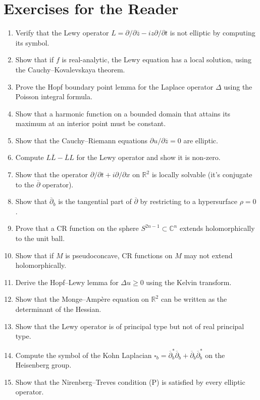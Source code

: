\section*{Exercises for the Reader}
\begin{enumerate}
    \item [B] Verify that the Lewy operator $L = \partial/\partial \overline{z} - i z \partial/\partial t$ is not elliptic by computing its symbol.
    \item [I] Show that if $f$ is real-analytic, the Lewy equation has a local solution, using the Cauchy--Kovalevskaya theorem.
    \item [I] Prove the Hopf boundary point lemma for the Laplace operator $\Delta$ using the Poisson integral formula.
    \item [B] Show that a harmonic function on a bounded domain that attains its maximum at an interior point must be constant.
    \item [B] Show that the Cauchy--Riemann equations $\partial u/\partial \overline{z} = 0$ are elliptic.
    \item [I] Compute $L\overline{L} - \overline{L}L$ for the Lewy operator and show it is non-zero.
    \item [I] Show that the operator $\partial/\partial t + i \partial/\partial x$ on $\mathbb{R}^2$ is locally solvable (it's conjugate to the $\overline{\partial}$ operator).
    \item [I] Show that $\overline{\partial}_b$ is the tangential part of $\overline{\partial}$ by restricting to a hypersurface $\rho = 0$.
    \item [I] Prove that a CR function on the sphere $S^{2n-1} \subset \mathbb{C}^n$ extends holomorphically to the unit ball.
    \item [A] Show that if $M$ is pseudoconcave, CR functions on $M$ may not extend holomorphically.
    \item [I] Derive the Hopf--Lewy lemma for $\Delta u \geq 0$ using the Kelvin transform.
    \item [B] Show that the Monge--Amp\`{e}re equation on $\mathbb{R}^2$ can be written as the determinant of the Hessian.
    \item [A] Show that the Lewy operator is of principal type but not of real principal type.
    \item [A] Compute the symbol of the Kohn Laplacian $\square_b = \overline{\partial}_b^* \overline{\partial}_b + \overline{\partial}_b \overline{\partial}_b^*$ on the Heisenberg group.
    \item [I] Show that the Nirenberg--Treves condition (P) is satisfied by every elliptic operator.
\end{enumerate}


